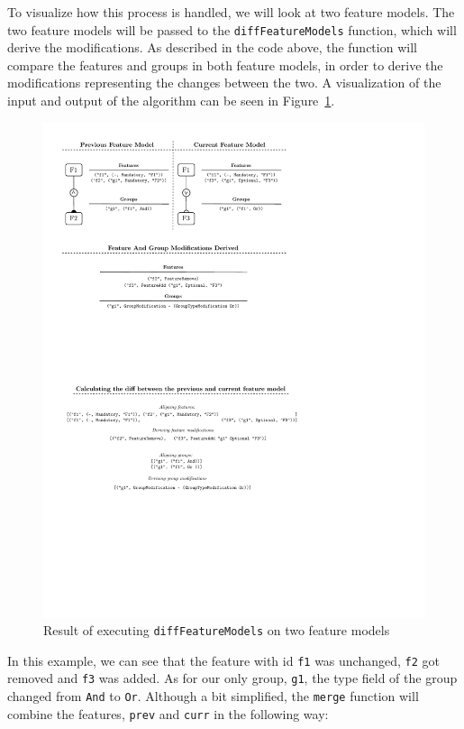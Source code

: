 \documentclass[a4paper,english]{ifimaster}
\begin{document}
To visualize how this process is handled, we will look at two feature models. The two feature models will be passed to the \texttt{diffFeatureModels} function, which will derive the modifications. As described in the code above, the function will compare the features and groups in both feature models, in order to derive the modifications representing the changes between the two. A visualization of the input and output of the algorithm can be seen in Figure~\ref{fig:diff_feature_models_visualized}.

\begin{figure}[htpb]
  \centering
  \includegraphics[]{feature_model_diff_visualized.pdf}
  \caption{Result of executing \texttt{diffFeatureModels} on two feature models}%
  \label{fig:diff_feature_models_visualized}
\end{figure}

In this example, we can see that the feature with id \texttt{f1} was unchanged, \texttt{f2} got removed and \texttt{f3} was added. As for our only group, \texttt{g1}, the type field of the group changed from \texttt{And} to \texttt{Or}. Although a bit simplified, the \texttt{merge} function will combine the features, \texttt{prev} and \texttt{curr} in the following way:
\end{document}
